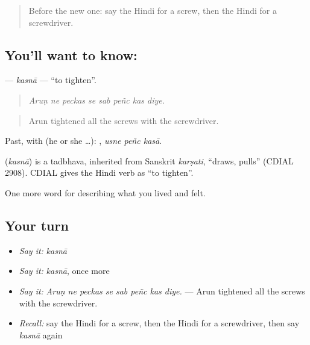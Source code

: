 \label{lesson:HI-C515-kasna}



\begin{quote}
Before the new one: say the Hindi for a screw, then the Hindi for a screwdriver.
\end{quote}

\subsection*{You'll want to know: }
\textbf{} — \emph{kasnā} — \textquotedblleft{}to tighten\textquotedblright{}.

\begin{quote}
       
\end{quote}

\begin{quote}
\emph{Aruṇ ne peckas se sab peñc kas diye.}
\end{quote}

\begin{quote}
Arun tightened all the screws with the screwdriver.
\end{quote}

Past, with  (he or she …):   , \emph{usne peñc kasā}.

\begin{cousinweb}
\textbf{} (\emph{kasnā}) is a tadbhava, inherited from Sanskrit \emph{karṣati}, \textquotedblleft{}draws, pulls\textquotedblright{} (CDIAL 2908). CDIAL gives the Hindi verb as \textquotedblleft{}to tighten\textquotedblright{}.
\end{cousinweb}

\begin{grammarlens}[title={What you've built}]
One more word for describing what you lived and felt.
\end{grammarlens}

\subsection*{Your turn}
\begin{itemize}
\raggedright
  \item \emph{Say it:} \emph{kasnā}
  \item \emph{Say it:} \emph{kasnā}, once more
  \item \emph{Say it:} \emph{Aruṇ ne peckas se sab peñc kas diye.} — Arun tightened all the screws with the screwdriver.
  \item \emph{Recall:} say the Hindi for a screw, then the Hindi for a screwdriver, then say \emph{kasnā} again
\end{itemize}

